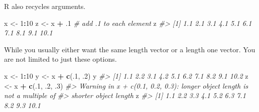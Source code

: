 \documentclass[]{book}
\newenvironment{Shaded}{\begin{snugshade}}{\end{snugshade}}
\newcommand{\KeywordTok}[1]{\textcolor[rgb]{0.13,0.29,0.53}{\textbf{#1}}}
\newcommand{\DecValTok}[1]{\textcolor[rgb]{0.00,0.00,0.81}{#1}}
\newcommand{\StringTok}[1]{\textcolor[rgb]{0.31,0.60,0.02}{#1}}
\newcommand{\CommentTok}[1]{\textcolor[rgb]{0.56,0.35,0.01}{\textit{#1}}}
\newcommand{\OperatorTok}[1]{\textcolor[rgb]{0.81,0.36,0.00}{\textbf{#1}}}
\newcommand{\NormalTok}[1]{#1}
\theoremstyle{definition}
\theoremstyle{definition}
\theoremstyle{definition}
\theoremstyle{remark}
\begin{document}
\begin{Shaded}
\end{Shaded}

R also recycles arguments.

\begin{Shaded}
\begin{Highlighting}[]
\NormalTok{x <-}\StringTok{ }\DecValTok{1}\OperatorTok{:}\DecValTok{10}
\NormalTok{z <-}\StringTok{ }\NormalTok{x }\OperatorTok{+}\StringTok{ }\NormalTok{.}\DecValTok{1}  \CommentTok{# add .1 to each element}
\NormalTok{z}
\CommentTok{#>  [1]  1.1  2.1  3.1  4.1  5.1  6.1  7.1  8.1  9.1 10.1}
\end{Highlighting}
\end{Shaded}

While you usually either want the same length vector or a length one
vector. You are not limited to just these options.

\begin{Shaded}
\begin{Highlighting}[]
\NormalTok{x <-}\StringTok{ }\DecValTok{1}\OperatorTok{:}\DecValTok{10}
\NormalTok{y <-}\StringTok{ }\NormalTok{x }\OperatorTok{+}\StringTok{ }\KeywordTok{c}\NormalTok{(.}\DecValTok{1}\NormalTok{, .}\DecValTok{2}\NormalTok{) }
\NormalTok{y}
\CommentTok{#>  [1]  1.1  2.2  3.1  4.2  5.1  6.2  7.1  8.2  9.1 10.2}
\NormalTok{z <-}\StringTok{ }\NormalTok{x }\OperatorTok{+}\StringTok{ }\KeywordTok{c}\NormalTok{(.}\DecValTok{1}\NormalTok{, .}\DecValTok{2}\NormalTok{, .}\DecValTok{3}\NormalTok{)}
\CommentTok{#> Warning in x + c(0.1, 0.2, 0.3): longer object length is not a multiple of}
\CommentTok{#> shorter object length}
\NormalTok{z}
\CommentTok{#>  [1]  1.1  2.2  3.3  4.1  5.2  6.3  7.1  8.2  9.3 10.1}
\end{Highlighting}
\end{Shaded}
\end{document}
